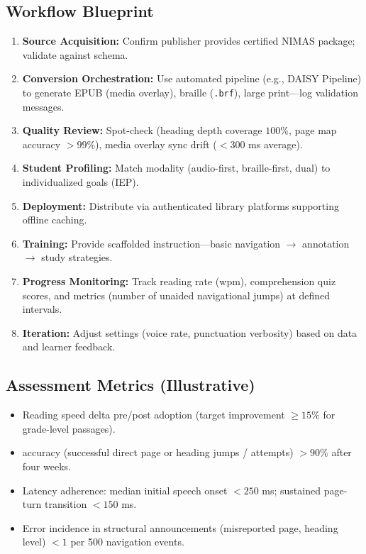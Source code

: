 \subsection{Workflow Blueprint}
\begin{enumerate}
	\item \textbf{Source Acquisition:} Confirm publisher provides certified NIMAS package; validate against schema.
	\item \textbf{Conversion Orchestration:} Use automated pipeline (e.g., DAISY Pipeline) to generate EPUB (media overlay),
	      braille (\texttt{.brf}), large print—log validation messages.
	\item \textbf{Quality Review:} Spot-check  (heading depth coverage $100\%$, page map accuracy $> 99\%$),
	      media overlay sync drift ($< 300$ ms average).
	\item \textbf{Student Profiling:} Match modality (audio-first, braille-first, dual) to individualized goals (IEP).
	\item \textbf{Deployment:} Distribute via authenticated library platforms supporting offline caching.
	\item \textbf{Training:} Provide scaffolded instruction—basic navigation $\rightarrow$ annotation $\rightarrow$ study strategies.
	\item \textbf{Progress Monitoring:} Track reading rate (wpm), comprehension quiz scores, and  metrics
	      (number of unaided navigational jumps) at defined intervals.
	\item \textbf{Iteration:} Adjust settings (voice rate, punctuation verbosity) based on data and learner feedback.
\end{enumerate}

\subsection{Assessment Metrics (Illustrative)}
\begin{itemize}
	\item Reading speed delta pre/post adoption (target improvement $\ge 15\%$ for grade-level passages).
	\item {} accuracy (successful direct page or heading jumps / attempts) $> 90\%$ after four weeks.
	\item Latency adherence: median initial speech onset $< 250$ ms; sustained page-turn transition $< 150$ ms.
	\item Error incidence in structural announcements (misreported page, heading level) $< 1$ per 500 navigation events.
\end{itemize}

